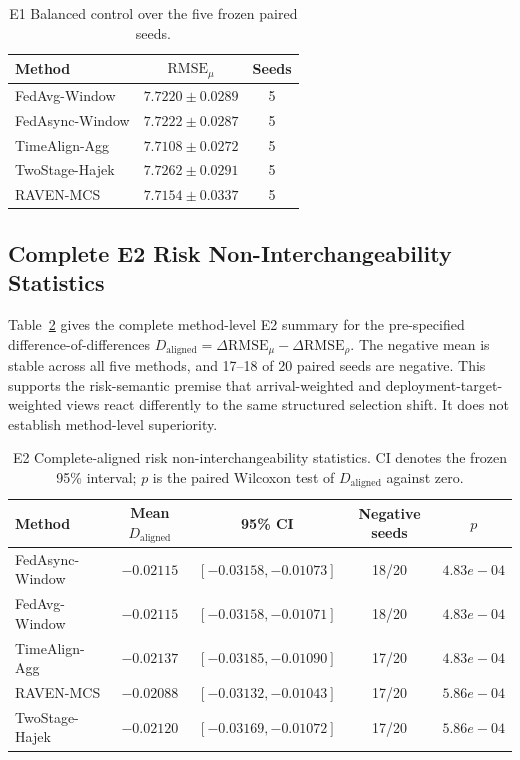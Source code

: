 \documentclass[letterpaper,journal]{IEEEtran}
\begin{document}
\begin{table}[t]
\centering
\caption{E1 Balanced control over the five frozen paired seeds.}
\label{tab:app_e1_balanced}
\footnotesize
\setlength{\tabcolsep}{5pt}
\begin{tabular}{lcc}
\toprule
Method & $\mathrm{RMSE}_\mu$ & Seeds\\
\midrule
FedAvg-Window & $7.7220\pm0.0289$ & 5 \\
FedAsync-Window & $7.7222\pm0.0287$ & 5 \\
TimeAlign-Agg & $7.7108\pm0.0272$ & 5 \\
TwoStage-Hajek & $7.7262\pm0.0291$ & 5 \\
RAVEN-MCS & $7.7154\pm0.0337$ & 5 \\
\bottomrule
\end{tabular}
\end{table}

\subsection{Complete E2 Risk Non-Interchangeability Statistics}
\label{app:e2_full_stats}

Table~\ref{tab:app_e2_daligned} gives the complete method-level E2 summary for
the pre-specified difference-of-differences
$D_{\mathrm{aligned}}=\Delta\mathrm{RMSE}_{\mu}
-\Delta\mathrm{RMSE}_{\rho}$.  The negative mean is stable across all five
methods, and 17--18 of 20 paired seeds are negative.  This supports the
risk-semantic premise that arrival-weighted and deployment-target-weighted
views react differently to the same structured selection shift.  It does not
establish method-level superiority.

\begin{table}[t]
\centering
\caption{E2 Complete-aligned risk non-interchangeability statistics.
CI denotes the frozen 95\% interval; $p$ is the paired Wilcoxon test of
$D_{\mathrm{aligned}}$ against zero.}
\label{tab:app_e2_daligned}
\footnotesize
\setlength{\tabcolsep}{4.5pt}
\begin{tabular}{lcccc}
\toprule
Method & Mean $D_{\mathrm{aligned}}$ & 95\% CI & Negative seeds & $p$\\
\midrule
FedAsync-Window & $-0.02115$ & $[-0.03158,-0.01073]$ & 18/20 & $4.83e-04$ \\
FedAvg-Window & $-0.02115$ & $[-0.03158,-0.01071]$ & 18/20 & $4.83e-04$ \\
TimeAlign-Agg & $-0.02137$ & $[-0.03185,-0.01090]$ & 17/20 & $4.83e-04$ \\
RAVEN-MCS & $-0.02088$ & $[-0.03132,-0.01043]$ & 17/20 & $5.86e-04$ \\
TwoStage-Hajek & $-0.02120$ & $[-0.03169,-0.01072]$ & 17/20 & $5.86e-04$ \\
\bottomrule
\end{tabular}
\end{table}
\end{document}
